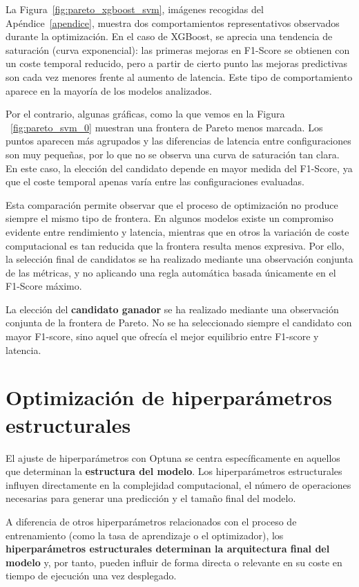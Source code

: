 La Figura~\ref{fig:pareto_xgboost_svm}, imágenes recogidas del Apéndice~\ref{apendice}, muestra dos comportamientos representativos observados durante la optimización. En el caso de XGBoost, se aprecia una tendencia de saturación (curva exponencial): las primeras mejoras en F1-Score se obtienen con un coste temporal reducido, pero a partir de cierto punto las mejoras predictivas son cada vez menores frente al aumento de latencia. Este tipo de comportamiento aparece en la mayoría de los modelos analizados.

Por el contrario, algunas gráficas, como la que vemos en la Figura ~\ref{fig:pareto_svm_0} muestran una frontera de Pareto menos marcada. Los puntos aparecen más agrupados y las diferencias de latencia entre configuraciones son muy pequeñas, por lo que no se observa una curva de saturación tan clara. En este caso, la elección del candidato depende en mayor medida del F1-Score, ya que el coste temporal apenas varía entre las configuraciones evaluadas.

Esta comparación permite observar que el proceso de optimización no produce siempre el mismo tipo de frontera. En algunos modelos existe un compromiso evidente entre rendimiento y latencia, mientras que en otros la variación de coste computacional es tan reducida que la frontera resulta menos expresiva. Por ello, la selección final de candidatos se ha realizado mediante una observación conjunta de las métricas, y no aplicando una regla automática basada únicamente en el F1-Score máximo.

La elección del \textbf{candidato ganador} se ha realizado mediante una observación conjunta de la frontera de Pareto. No se ha seleccionado siempre el candidato con mayor F1-score, sino aquel que ofrecía el mejor equilibrio entre F1-score y latencia.

\section{Optimización de hiperparámetros estructurales}

El ajuste de hiperparámetros con Optuna se centra específicamente en aquellos que determinan la \textbf{estructura del modelo}. Los hiperparámetros estructurales influyen directamente en la complejidad computacional, el número de operaciones necesarias para generar una predicción y el tamaño final del modelo.

A diferencia de otros hiperparámetros relacionados con el proceso de entrenamiento (como la tasa de aprendizaje o el optimizador), los \textbf{hiperparámetros estructurales determinan la arquitectura final del modelo} y, por tanto, pueden influir de forma directa o relevante en su coste en tiempo de ejecución una vez desplegado.

